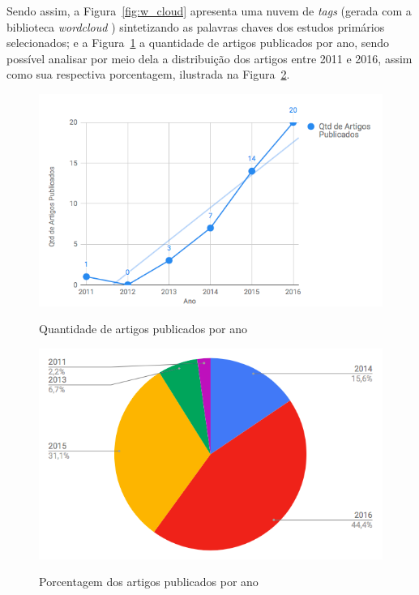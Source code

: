 \documentclass[
	12pt,				%
	oneside,			%
	a4paper,			%
	english,			%
	brazil				%
	]{abntex2ppgsi}
\begin{document}
{{{Sendo assim, a Figura~\ref{fig:w_cloud} apresenta uma nuvem de \textit{tags} (gerada com a biblioteca \textit{wordcloud} \cite{wordcloud}) sintetizando as palavras chaves dos estudos primários selecionados; e a Figura~\ref{fig:qtd} a quantidade de artigos publicados por ano, sendo possível analisar por meio dela a distribuição dos artigos entre 2011 e 2016, assim como sua respectiva porcentagem, ilustrada na Figura~\ref{fig:porcentagem}.

\begin{figure}[H]%
	\centering
 	  \caption{Quantidade de artigos publicados por ano}
		\includegraphics[width=0.8\linewidth]{images/g1.png}
	\label{fig:qtd}
\end{figure}

\begin{figure}[H]%
	\centering
 	  \caption{Porcentagem dos artigos publicados por ano}
		\includegraphics[width=0.8\linewidth]{images/g2.png}
	\label{fig:porcentagem}
\end{figure}

}}}
\end{document}
